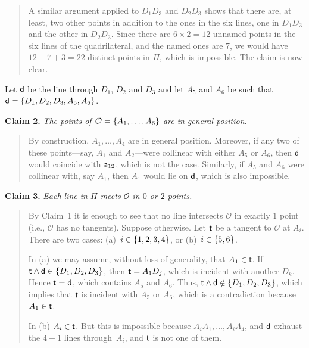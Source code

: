 \begin{solution}
\begin{description}
\begin{quote}
            A similar argument applied to $D_1D_3$ and $D_2D_3$ shows that there are, at least, two other points in addition to the ones in the six lines, one in $D_1D_3$ and the other in $D_2D_3$. Since there are $6\times 2=12$ unnamed points in the six lines of the quadrilateral, and the named ones are $7$, we would have $12+7+3=22$ distinct points in $\Pi$, which is impossible. The claim is now clear.
        \end{quote}
        
        Let $\mathsf d$ be the line through $D_1$, $D_2$ and $D_3$ and let $A_5$ and $A_6$ be such that $\mathsf d=\{D_1,D_2,D_3,A_5,A_6\}$.

        \textbf{Claim 2.} \textit{The points of\/ $\mathcal O=\{A_1,\dots,A_6\}$ are in general position.}

        \begin{quote}
            By construction, $A_1, \dots, A_4$ are in general position. Moreover, if any two of these points—say, $A_1$ and $A_2$—were collinear with either $A_5$ or $A_6$, then $\mathsf d$ would coincide with $\mathsf a_{12}$, which is not the case. Similarly, if $A_5$ and $A_6$ were collinear with, say $A_1$, then $A_1$ would lie on $\mathsf d$, which is also impossible.
        \end{quote}

        \textbf{Claim 3.} \textit{Each line in\/ $\Pi$ meets $\mathcal O$ in\/ $0$ or\/ $2$ points.}

        \begin{quote}
            By Claim~1 it is enough to see that no line intersects $\mathcal O$ in exactly $1$ point (i.e., $\mathcal O$ has no tangents). Suppose otherwise. Let $\mathsf t$ be a tangent to $\mathcal O$ at $A_i$. There are two cases: (a)~$i\in\{1,2,3,4\}$, or (b)~$i\in\{5,6\}$.
            
            In (a) we may assume, without loss of generality, that $A_1\in\mathsf t$. If $\mathsf t\wedge\mathsf d\in\{D_1,D_2,D_3\}$, then $\mathsf t=A_1D_j$, which is incident with another $D_k$. Hence $\mathsf t=\mathsf d$, which contains $A_5$ and $A_6$. Thus, $\mathsf t\wedge\mathsf d\notin\{D_1,D_2,D_3\}$, which implies that  $\mathsf t$ is incident with $A_5$ or $A_6$, which is a contradiction because $A_1\in\mathsf t$.

            In (b) $A_i\in\mathsf t$. But this is impossible because $A_iA_1,\dots, A_iA_4$, and $\mathsf d$ exhaust the $4+1$ lines through~$A_i$, and $\mathsf t$ is not one of them.
        \end{quote}


\end{description}
\end{solution}
